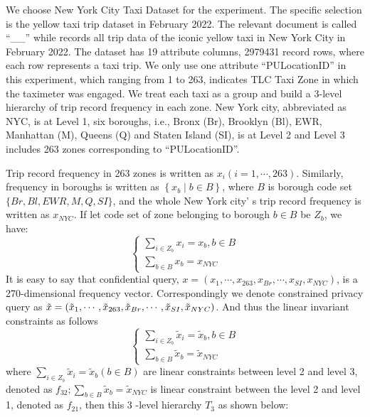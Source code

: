 \documentclass[11pt]{article}
\begin{document}
We choose New York City Taxi Dataset \cite{NYC2022} for the experiment. The specific selection is the yellow taxi trip dataset in February 2022. The relevant document is called “\!\!\_\!\!\!\!\_\!\!” while records all trip data of the iconic yellow taxi in New York City in February 2022. The dataset has 19 attribute columns, 2979431 record rows, where each row represents a taxi trip. We only use one attribute “PULocationID” in this experiment, which ranging from 1 to 263, indicates TLC Taxi Zone in which the taximeter was engaged. We treat each taxi as a group and build a 3-level hierarchy of trip record frequency in each zone. New York city, abbreviated as NYC, is at Level 1, six boroughs, i.e., Bronx (Br), Brooklyn (Bl), EWR, Manhattan (M), Queens (Q) and Staten Island (SI), is at Level 2 and Level 3 includes 263 zones corresponding to “PULocationID”.


Trip record frequency in 263 zones is written as $x_{i}(i=1, \cdots, 263)$. Similarly, frequency in boroughs is written as $\left\{x_{b} \mid b \in B\right\}$, where $B$ is borough code set $\{B r, B l, E W R, M, Q, S I\}$, and the whole New York city' s trip record frequency is written as $x_{N Y C}$. If let code set of zone belonging to borough $b \in B$ be $Z_{b}$, we have:
$$
\left\{\begin{array}{l}
\sum_{i \in Z_{b}} x_{i}=x_{b}, b \in B \\
\sum_{b \in B} x_{b}=x_{N Y C}
\end{array}\right.
$$
It is easy to say that confidential query, $x=\left(x_{1}, \cdots, x_{263}, x_{B r}, \cdots, x_{S I}, x_{N Y C}\right)$, is a 270-dimensional frequency vector. Correspondingly we denote constrained privacy query as $\tilde{x}=(\tilde{x}_{1}, \cdots, \tilde{x}_{263}, \tilde{x}_{B r}, \cdots,\\  \tilde{x}_{S I}, \tilde{x}_{N Y C})$. And thus the linear invariant constraints as follows
$$
\left\{\begin{array}{l}
\sum_{i \in Z_{b}} \tilde{x}_{i}=\tilde{x}_{b}, b \in B\\
\sum_{b \in B} \tilde{x}_{b}=\tilde{x}_{N Y C}
\end{array}\right.
$$
where $\sum_{i \in Z_{b}} \tilde{x}_{i}=\tilde{x}_{b}(b \in B)$ are linear constraints between level 2 and level 3, denoted as $f_{32} ; \sum_{b \in B} \tilde{x}_{b}=\tilde{x}_{N Y C}$ is linear constraint between the level 2 and level 1, denoted as $f_{21}$, then this 3 -level hierarchy $T_{3}$ as shown below:
\end{document}
